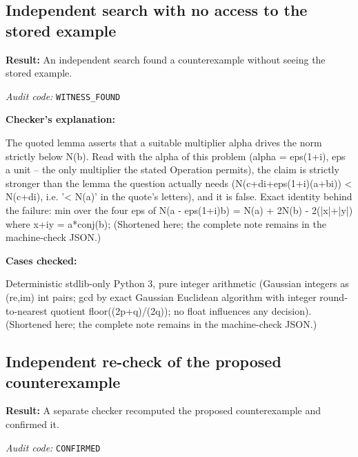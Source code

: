 \documentclass[11pt]{article}
\begin{document}
\subsection*{Independent search with no access to the stored example}
\textbf{Result:} An independent search found a counterexample without seeing the stored example.
\par\textit{Audit code:} \nolinkurl{WITNESS_FOUND}
\par\textbf{Checker's explanation:}
\begin{Vsrc}
The quoted lemma asserts that a suitable multiplier alpha drives the norm strictly below N(b). Read with the alpha of this problem (alpha = eps(1+i), eps a unit -- the only multiplier the stated Operation permits), the claim is strictly stronger than the lemma the question actually needs (N(c+di+eps(1+i)(a+bi)) < N(c+di), i.e. '< N(a)' in the quote's letters), and it is false. Exact identity behind the failure: min over the four eps of N(a - eps(1+i)b) = N(a) + 2N(b) - 2(|x|+|y|) where x+iy = a*conj(b); (Shortened here; the complete note remains in the machine-check JSON.)
\end{Vsrc}
\par\textbf{Cases checked:}
\begin{Vsrc}
Deterministic stdlib-only Python 3, pure integer arithmetic (Gaussian integers as (re,im) int pairs; gcd by exact Gaussian Euclidean algorithm with integer round-to-nearest quotient floor((2p+q)/(2q)); no float influences any decision). (Shortened here; the complete note remains in the machine-check JSON.)
\end{Vsrc}
\subsection*{Independent re-check of the proposed counterexample}
\textbf{Result:} A separate checker recomputed the proposed counterexample and confirmed it.
\par\textit{Audit code:} \nolinkurl{CONFIRMED}
\end{document}
